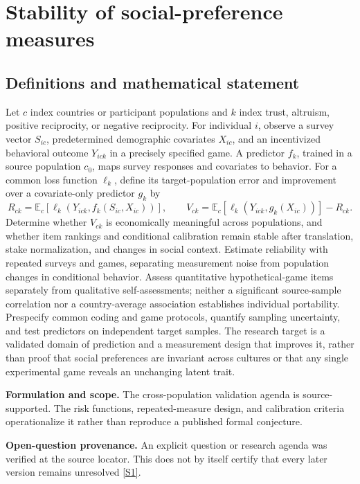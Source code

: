 \documentclass[11pt]{article}
\newcommand{\sref}[2]{\hyperlink{source:#1:#2}{[S#2]}}
\begin{document}
\section*{Stability of social-preference measures}\label{30007585}
\subsection{Definitions and mathematical statement}
Let \(c\) index countries or participant populations and \(k\) index trust, altruism, positive reciprocity, or negative reciprocity. For individual \(i\), observe a survey vector \(S_{ic}\), predetermined demographic covariates \(X_{ic}\), and an incentivized behavioral outcome \(Y_{ick}\) in a precisely specified game. A predictor \(f_k\), trained in a source population \(c_0\), maps survey responses and covariates to behavior. For a common loss function \(\ell_k\), define its target-population error and improvement over a covariate-only predictor \(g_k\) by
\[R_{ck}=\mathbb E_c[\ell_k(Y_{ick},f_k(S_{ic},X_{ic}))],\qquad V_{ck}=\mathbb E_c[\ell_k(Y_{ick},g_k(X_{ic}))]-R_{ck}.\]
Determine whether \(V_{ck}\) is economically meaningful across populations, and whether item rankings and conditional calibration remain stable after translation, stake normalization, and changes in social context. Estimate reliability with repeated surveys and games, separating measurement noise from population changes in conditional behavior. Assess quantitative hypothetical-game items separately from qualitative self-assessments; neither a significant source-sample correlation nor a country-average association establishes individual portability. Prespecify common coding and game protocols, quantify sampling uncertainty, and test predictors on independent target samples. The research target is a validated domain of prediction and a measurement design that improves it, rather than proof that social preferences are invariant across cultures or that any single experimental game reveals an unchanging latent trait.

\par\textbf{Formulation and scope.} The cross-population validation agenda is source-supported. The risk functions, repeated-measure design, and calibration criteria operationalize it rather than reproduce a published formal conjecture.

\par\textbf{Open-question provenance.} An explicit question or research agenda was verified at the source locator. This does not by itself certify that every later version remains unresolved \sref{30007585}{1}.
\end{document}
